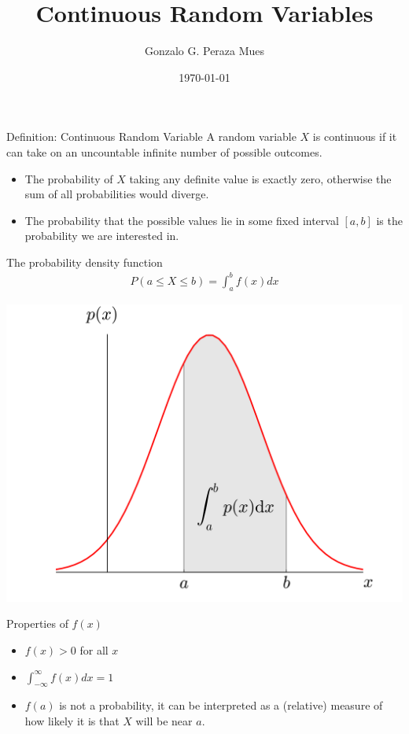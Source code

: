 \documentclass{beamer}
\title{Continuous Random Variables}
\date{\today}
\author{Gonzalo G. Peraza Mues}
\begin{document}
\maketitle

\begin{frame}{Definition: Continuous Random Variable}
  A random variable $X$ is \alert{continuous} if it can take on an uncountable
  infinite number of possible outcomes.

  \begin{itemize}
  \item The probability of $X$ taking any \alert{definite} value is exactly
    zero, otherwise the sum of all probabilities would diverge.
  \item The probability that the possible values lie in some fixed
    \alert{interval} $[a, b]$ is the probability we are interested in.
  \end{itemize}
\end{frame}

\begin{frame}{The probability density function}
  \begin{align*}
    P(a\leq X  \leq b) = \int_a^b f(x)dx
  \end{align*}

  \begin{center}
    \includegraphics[width=0.7\linewidth]{PDF}
  \end{center}
\end{frame}

\begin{frame}{Properties of $f(x)$}
  \begin{itemize}
  \item $f(x) > 0$ for all $x$
  \item $\int_{-\infty}^\infty f(x)dx = 1$
  \item $f(a)$ is not a probability, it can be interpreted as a (relative)
    measure of how likely it is that $X$ will be near $a$.
  \end{itemize}
\end{frame}
\end{document}
